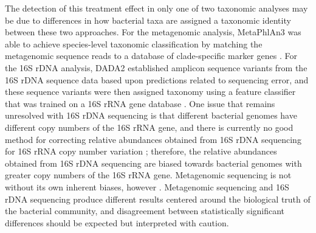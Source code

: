 The detection of this treatment effect in only one of two taxonomic analyses may be due to differences in how bacterial taxa are assigned a taxonomic identity between these two approaches.
For the metagenomic analysis, MetaPhlAn3 was able to achieve species-level taxonomic classification by matching the metagenomic sequence reads to a database of clade-specific marker genes \parencite{Beghini.2020}.
For the 16S rDNA analysis, DADA2 established amplicon sequence variants from the 16S rDNA sequence data based upon predictions related to sequencing error, and these sequence variants were then assigned taxonomy using a feature classifier that was trained on a 16S rRNA gene database \parencite{Callahan.2016, Bokulich.2018, Quast.2013}.
One issue that remains unresolved with 16S rDNA sequencing is that different bacterial genomes have different copy numbers of the 16S rRNA gene, and there is currently no good method for correcting relative abundances obtained from 16S rDNA sequencing for 16S rRNA copy number variation \parencite{Starke.2021}; therefore, the relative abundances obtained from 16S rDNA sequencing are biased towards bacterial genomes with greater copy numbers of the 16S rRNA gene.
Metagenomic sequencing is not without its own inherent biases, however \parencite{McLaren.2019}.
Metagenomic sequencing and 16S rDNA sequencing produce different results centered around the biological truth of the bacterial community, and disagreement between statistically significant differences should be expected but interpreted with caution.

